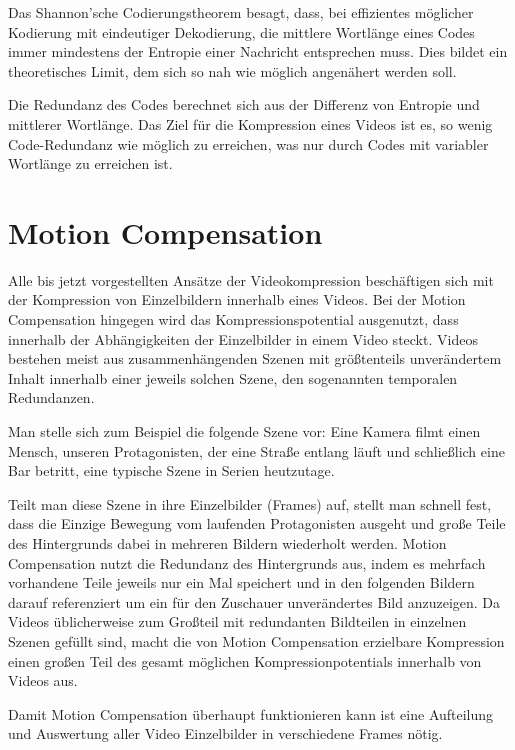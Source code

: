 Das Shannon'sche Codierungstheorem besagt, dass, bei effizientes möglicher Kodierung mit eindeutiger Dekodierung, die mittlere Wortlänge eines Codes immer mindestens der Entropie einer Nachricht entsprechen muss. Dies bildet ein theoretisches Limit, dem sich so nah wie möglich angenähert werden soll.

Die Redundanz des Codes berechnet sich aus der Differenz von Entropie und mittlerer Wortlänge. Das Ziel für die Kompression eines Videos ist es, so wenig Code-Redundanz wie möglich zu erreichen, was nur durch Codes mit variabler Wortlänge zu erreichen ist.


\section{Motion Compensation}

Alle bis jetzt vorgestellten Ansätze der Videokompression beschäftigen sich mit der Kompression von Einzelbildern innerhalb eines Videos. Bei der Motion Compensation hingegen wird das Kompressionspotential ausgenutzt, dass innerhalb der Abhängigkeiten der Einzelbilder in einem Video steckt.
Videos bestehen meist aus zusammenhängenden Szenen mit größtenteils unverändertem Inhalt innerhalb einer jeweils solchen Szene, den sogenannten temporalen Redundanzen.

Man stelle sich zum Beispiel die folgende Szene vor: Eine Kamera filmt einen Mensch, unseren Protagonisten, der eine Straße entlang läuft und schließlich eine Bar betritt, eine typische Szene in Serien heutzutage.

Teilt man diese Szene in ihre Einzelbilder (Frames) auf, stellt man schnell fest, dass die Einzige Bewegung vom laufenden Protagonisten ausgeht und große Teile des Hintergrunds dabei in mehreren Bildern wiederholt werden.
Motion Compensation nutzt die Redundanz des Hintergrunds aus, indem es mehrfach vorhandene Teile jeweils nur ein Mal speichert und in den folgenden Bildern darauf referenziert um ein für den Zuschauer unverändertes Bild anzuzeigen.
Da Videos üblicherweise zum Großteil mit redundanten Bildteilen in einzelnen Szenen gefüllt sind, macht die von Motion Compensation erzielbare Kompression einen großen Teil des gesamt möglichen Kompressionpotentials innerhalb von Videos aus.

Damit Motion Compensation überhaupt funktionieren kann ist eine Aufteilung und Auswertung aller Video Einzelbilder in verschiedene Frames nötig.
